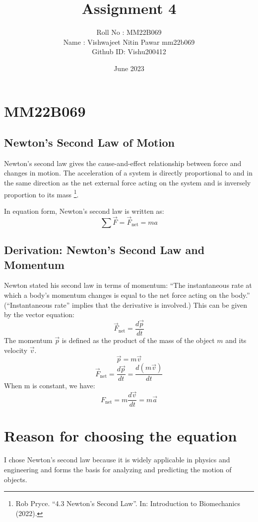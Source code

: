 \documentclass{article}
\title{Assignment 4}
\author{Roll No : MM22B069 \\ Name : Vishwajeet Nitin Pawar mm22b069 \\ Github ID: Vishu200412}
\date{June 2023}
\begin{document}
\maketitle
\begin{center}
    
\end{center}
\section*{MM22B069}
\subsection*{Newton's Second Law of Motion}
Newton's second law gives the cause-and-effect relationship between force and changes in motion. The acceleration of a system is directly proportional to and in the same direction as the net external force acting on the system and is inversely proportion to its mass \footnote{Rob Pryce. “4.3 Newton’s Second Law”. In: Introduction to Biomechanics
(2022).}.

\noindent 
In equation form, Newton’s second law is written as:
\[\sum \vec{F} = \vec{F}_{\text{net}} = ma\]
\subsection*{Derivation: Newton’s Second Law and Momentum}
Newton stated his second law in terms of momentum: “The instantaneous rate at which a body’s momentum changes is equal to the net force acting on the body.” (“Instantaneous rate” implies that the derivative is involved.) This can be given by the vector equation:
\[\vec{F}_{\text{net}} = \frac{d\vec{p}}{dt}\]
The momentum \(\vec{p}\) is defined as the product of the mass of the object \(m\) and its velocity \(\vec{v}\).
\[\vec{p} = m\vec{v}\]
\[\vec{F}_{\text{net}} = \frac{d\vec{p}}{dt} = \frac{d(m\vec{v})}{dt}\]
When m is constant, we have:
\[F_{\text{net}} = m\frac{d\vec{v}}{dt} = m\vec{a}\]
\section*{Reason for choosing the equation}
I chose Newton's second law because it is widely applicable in physics and engineering and forms the basis for analyzing and predicting the motion of objects.

\newpage
\printbibliography
\end{document}
